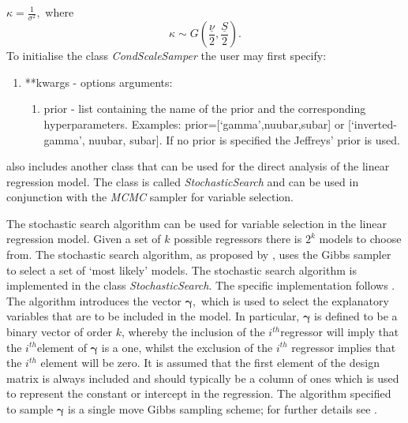 \documentclass[article]{jss}
\begin{document}
$\kappa=\frac{1}{\sigma^{2}},$ where\[ \kappa\sim
G\left(\frac{\underline{\nu}}{2},\frac{\underline{S}}{2}\right).\] To
initialise the class \emph{CondScaleSamper} the user may first
specify:
\begin{enumerate}
\item {*}{*}kwargs - options arguments:

\begin{enumerate}
\item prior - list containing the name of the prior and the
  corresponding hyperparameters. Examples:
  prior={[}`gamma',nuubar,subar{]} or {[}`inverted-gamma', nuubar,
  subar{]}. If no prior is specified the Jeffreys' prior is used.
\end{enumerate}
\end{enumerate}
 also includes another class that can be used for the
direct analysis of the linear regression model. The class is called
\emph{StochasticSearch }and can be used in conjunction with the
\emph{MCMC} sampler for variable selection.

The stochastic search algorithm can be used for variable selection in
the linear regression model. Given a set of $k$ possible regressors
there is $2^{k}$ models to choose from. The stochastic search
algorithm, as proposed by \citet{GeorgeMcCulloch1993}, uses the Gibbs
sampler to select a set of `most likely' models. The stochastic search
algorithm is implemented in the class \emph{StochasticSearch}. The
specific implementation follows \citet{MarinRobert2007}. The algorithm
introduces the vector $\bm{\gamma},$ which is used to select the
explanatory variables that are to be included in the model. In
particular, $\bm{\gamma}$ is defined to be a binary vector of order
$k$, whereby the inclusion of the $i^{th}$regressor will imply that
the $i^{th}$element of $\bm{\gamma}$ is a one, whilst the exclusion of
the $i^{th}$ regressor implies that the $i^{th}$ element will be zero.
It is assumed that the first element of the design matrix is always
included and should typically be a column of ones which is used to
represent the constant or intercept in the regression. The algorithm
specified to sample $\bm{\gamma}$ is a single move Gibbs sampling
scheme; for further details see \citet{MarinRobert2007}.
\end{document}
